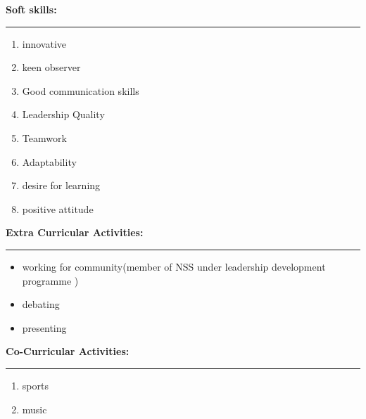 \documentclass[a4paper,10pt]{article}
\begin{document}
\begin{flushleft}
    \newpage
     \textbf{Soft skills:}\\
  \hrule
    \begin{enumerate}
    \item innovative\\
    \item keen observer\\
    	\item Good communication skills\\
    	\item Leadership Quality\\
    	\item Teamwork \\
    	\item Adaptability\\
    	\item  desire for learning\\
    	\item positive attitude\\
    \end{enumerate}
    \textbf{Extra Curricular Activities:}\\
  \hrule
  
   
  
  \begin{itemize}
  	\item working for community(member of NSS under leadership development programme )
  \item debating
   \item presenting
  	
  \end{itemize}
\textbf{Co-Curricular Activities:}\\
  \hrule
  
   
  
  \begin{enumerate}
  
 
  	\item sports
  \item music
  	 \end{enumerate}
   
	\end{flushleft}
	
\end{document}
